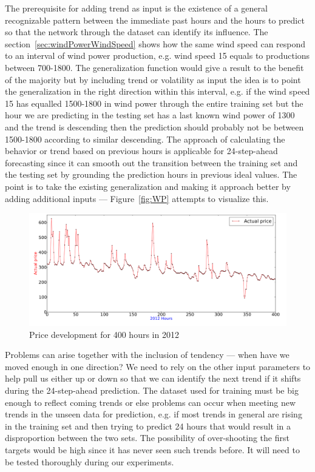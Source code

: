 The prerequisite for adding trend as input is the existence of a general recognizable pattern between the immediate past hours and the hours to predict so that the network through the dataset can identify its influence. The section~\ref{sec:windPowerWindSpeed} shows how the same wind speed can respond to an interval of wind power production, e.g. wind speed 15 equals to productions between 700-1800. The generalization function would give a result to the benefit of the majority but by including trend or volatility as input the idea is to point the generalization in the right direction within this interval, e.g. if the wind speed 15 has equalled 1500-1800 in wind power through the entire training set but the hour we are predicting in the testing set has a last known wind power of 1300 and the trend is descending then the prediction should probably not be between 1500-1800 according to similar descending. The approach of calculating the behavior or trend based on previous hours is applicable for 24-step-ahead forecasting since it can smooth out the transition between the training set and the testing set by grounding the prediction hours in previous ideal values. The point is to take the existing generalization and making it approach better by adding additional inputs --- Figure~\ref{fig:WP} attempts to visualize this. 

\begin{figure}[h]
\centering
\includegraphics[width=0.99\linewidth]{billeder/priceGraph400.png}
\caption{Price development for 400 hours in 2012}
\label{fig:priceHourDevelopment400HoursStatistics}
\end{figure}

Problems can arise together with the inclusion of tendency --- when have we moved enough in one direction? We need to rely on the other input parameters to help pull us either up or down so that we can identify the next trend if it shifts during the 24-step-ahead prediction. The dataset used for training must be big enough to reflect coming trends or else problems can occur when meeting new trends in the unseen data for prediction, e.g. if most trends in general are rising in the training set and then trying to predict 24 hours that would result in a disproportion between the two sets. The possibility of over-shooting the first targets would be high since it has never seen such trends before. It will need to be tested thoroughly during our experiments. 

